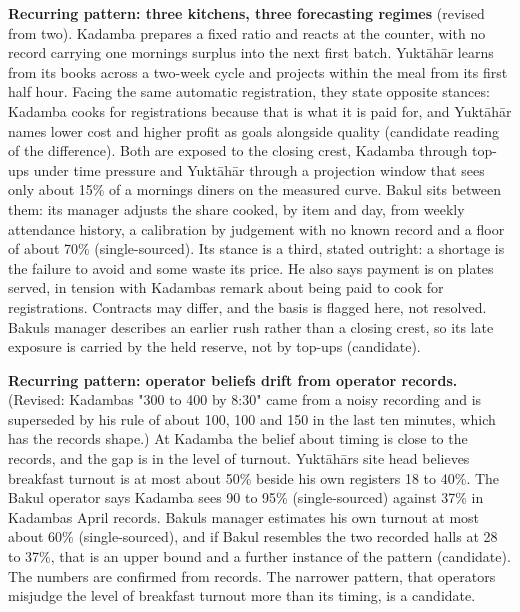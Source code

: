 \documentclass[
  10pt,
  table]{article}
\begin{document}
\textbf{Recurring pattern: three kitchens, three forecasting regimes} (revised from two). Kadamba prepares a fixed ratio and reacts at the counter, with no record carrying one morning\textquotesingle s surplus into the next first batch. Yuktāhār learns from its books across a two-week cycle and projects within the meal from its first half hour. Facing the same automatic registration, they state opposite stances: Kadamba cooks for registrations because that is what it is paid for, and Yuktāhār names lower cost and higher profit as goals alongside quality (candidate reading of the difference). Both are exposed to the closing crest, Kadamba through top-ups under time pressure and Yuktāhār through a projection window that sees only about 15\% of a morning\textquotesingle s diners on the measured curve. Bakul sits between them: its manager adjusts the share cooked, by item and day, from weekly attendance history, a calibration by judgement with no known record and a floor of about 70\% (single-sourced). Its stance is a third, stated outright: a shortage is the failure to avoid and some waste its price. He also says payment is on plates served, in tension with Kadamba\textquotesingle s remark about being paid to cook for registrations. Contracts may differ, and the basis is flagged here, not resolved. Bakul\textquotesingle s manager describes an earlier rush rather than a closing crest, so its late exposure is carried by the held reserve, not by top-ups (candidate).

\textbf{Recurring pattern: operator beliefs drift from operator records.} (Revised: Kadamba\textquotesingle s "300 to 400 by 8:30" came from a noisy recording and is superseded by his rule of about 100, 100 and 150 in the last ten minutes, which has the records\textquotesingle{} shape.) At Kadamba the belief about timing is close to the records, and the gap is in the level of turnout. Yuktāhār\textquotesingle s site head believes breakfast turnout is at most about 50\% beside his own register\textquotesingle s 18 to 40\%. The Bakul operator says Kadamba sees 90 to 95\% (single-sourced) against 37\% in Kadamba\textquotesingle s April records. Bakul\textquotesingle s manager estimates his own turnout at most about 60\% (single-sourced), and if Bakul resembles the two recorded halls at 28 to 37\%, that is an upper bound and a further instance of the pattern (candidate). The numbers are confirmed from records. The narrower pattern, that operators misjudge the level of breakfast turnout more than its timing, is a candidate.
\end{document}
